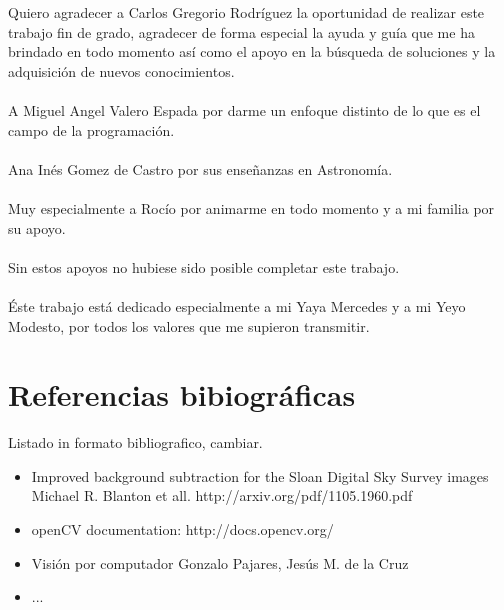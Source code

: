 	Quiero agradecer a Carlos Gregorio Rodríguez la oportunidad de realizar este trabajo fin de grado, agradecer de forma especial la ayuda y guía que me ha brindado en todo momento así como el apoyo en la búsqueda de soluciones y la adquisición de nuevos conocimientos.\\ 
	\\ A Miguel Angel Valero Espada por darme un enfoque distinto de lo que es el campo de la programación.\\
	\\ Ana Inés Gomez de Castro por sus enseñanzas en Astronomía.\\
	\\ Muy especialmente a Rocío por animarme en todo momento y a mi familia por su apoyo.\\
	\\ Sin estos apoyos no hubiese sido posible completar este trabajo.
	\\
	\\Éste trabajo está dedicado especialmente a mi Yaya Mercedes y a mi Yeyo Modesto, por todos los valores que me supieron transmitir.
	\newpage
	\section{Referencias bibiográficas}
	Listado in formato bibliografico, cambiar.
	\begin{itemize}
		\item Improved background subtraction for the Sloan Digital Sky Survey images Michael R. Blanton et all. http://arxiv.org/pdf/1105.1960.pdf
		\item openCV documentation: http://docs.opencv.org/
		\item Visión por computador Gonzalo Pajares, Jesús M. de la Cruz
		\item ...
	\end{itemize}
